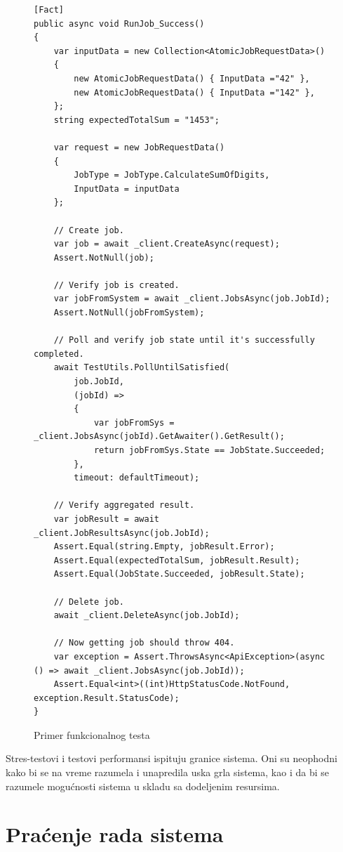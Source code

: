 \documentclass[12pt,oneside]{memoir}
\begin{document}
\begin{figure}[h!]
\centering
\begin{lstlisting}
[Fact]
public async void RunJob_Success()
{
	var inputData = new Collection<AtomicJobRequestData>()
	{
		new AtomicJobRequestData() { InputData ="42" },
		new AtomicJobRequestData() { InputData ="142" },
	};
	string expectedTotalSum = "1453";

	var request = new JobRequestData()
	{
		JobType = JobType.CalculateSumOfDigits,
		InputData = inputData
	};

	// Create job.
	var job = await _client.CreateAsync(request);
	Assert.NotNull(job);

	// Verify job is created.
	var jobFromSystem = await _client.JobsAsync(job.JobId);
	Assert.NotNull(jobFromSystem);

	// Poll and verify job state until it's successfully completed.
	await TestUtils.PollUntilSatisfied(
		job.JobId,
		(jobId) =>
		{
			var jobFromSys = _client.JobsAsync(jobId).GetAwaiter().GetResult();
			return jobFromSys.State == JobState.Succeeded;
		},
		timeout: defaultTimeout);

	// Verify aggregated result.
	var jobResult = await _client.JobResultsAsync(job.JobId);
	Assert.Equal(string.Empty, jobResult.Error);
	Assert.Equal(expectedTotalSum, jobResult.Result);
	Assert.Equal(JobState.Succeeded, jobResult.State);

	// Delete job.
	await _client.DeleteAsync(job.JobId);

	// Now getting job should throw 404.
	var exception = Assert.ThrowsAsync<ApiException>(async () => await _client.JobsAsync(job.JobId));
	Assert.Equal<int>((int)HttpStatusCode.NotFound, exception.Result.StatusCode);
}
\end{lstlisting}
\caption{Primer funkcionalnog testa}
\label{fig:teste2e}
\end{figure}

Stres-testovi i testovi performansi ispituju granice sistema. Oni su neophodni kako bi se na vreme razumela i unapredila uska grla sistema, kao i da bi se razumele mogućnosti sistema u skladu sa dodeljenim resursima.


\section{Praćenje rada sistema}
\label{chp:pracenjemetrika}
\end{document}
